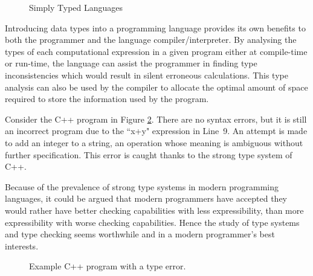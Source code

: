 \documentclass{UoYCSproject}
\begin{document}
\begin{figure}
    \begin{minipage}[b]{.45\textwidth}
        
        \label{fig:LISP}
    \end{minipage} \hfill
    \begin{minipage}[b]{.5\textwidth}
        
        \label{fig:Assembly}
    \end{minipage}
    \caption{Simply Typed Languages}
    \label{fig:SimpleTypedLanguages}
\end{figure}


Introducing data types into a programming language provides its own benefits
to both the programmer and the language compiler/interpreter. By analysing the
types of each computational expression in a given program either at compile-time
or run-time, the language can assist the programmer in finding type 
inconsistencies which would result in silent erroneous calculations. This type
analysis can also be used by the compiler to allocate the optimal amount of 
space required to store the information used by the program. 

Consider the C++ program in Figure \ref{fig:C++TypeError}.
There are no syntax errors, but it is still an incorrect program due to the
``x+y" expression in Line~9. An attempt is made to add an integer to a string,
an operation whose meaning is ambiguous without further specification. This
error is caught thanks to the strong type system of C++.

Because of the prevalence of strong type systems in modern programming
languages, it could be argued that modern programmers have accepted they would
rather have better checking capabilities with less expressibility, than more
expressibility with worse checking capabilities. Hence the study of type systems
and type checking seems worthwhile and in a modern programmer's best interests.

\begin{figure}


\caption{Example C++ program with a type error.}
\label{fig:C++TypeError}
\end{figure}
\end{document}
